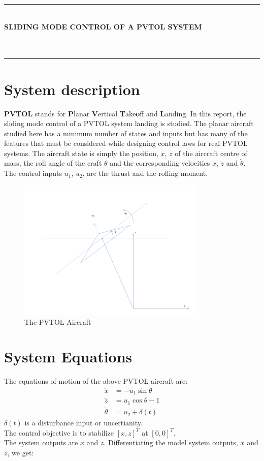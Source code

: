 \documentclass{article}
\newcommand{\hmwkTitle}{}
\newcommand{\hmwkDueDate}{}
\newcommand{\hmwkClass}{Sliding Mode Control of a PVTOL system}
\begin{document}
\clearpage
\thispagestyle{empty}
\clearpage
\noindent\rule{\textwidth}{0.4pt} \\
\textbf{\MakeUppercase{\hmwkClass}} \\
\textbf{\MakeUppercase{\hmwkTitle}} \\
\hmwkDueDate \\

\noindent\rule{\textwidth}{0.4pt}
\section{System description}
\textbf{PVTOL} stands for \textbf{P}lanar \textbf{V}ertical \textbf{T}ake\textbf{o}ff and \textbf{L}anding. In this report, the sliding mode control of a PVTOL system landing is studied. The planar aircraft studied here has a minimum number of states and inputs but has many of the features that must be considered while designing control laws for real PVTOL systems. The  aircraft state is simply the position, $x$, $z$ of the aircraft centre of mass, the roll angle of the craft $\theta$ and the corresponding velocities $\dot{x}$, $\dot{z}$ and $\dot{\theta}$. The control inputs $u_1$, $u_2$, are the thrust and the rolling moment. \\
\begin{figure}[H]
\centering
\includegraphics[width = 0.8\textwidth]{Figures/figure1.png}
\caption{The PVTOL Aircraft}
\label{fig:figure1}
\end{figure}
\section{System Equations}
The equations of motion of the above PVTOL aircraft are:
\begin{equation}\label{set 1.1}
  \begin{split}
\ddot{x}&=-u_1 \sin \theta \\
\ddot{z}&=u_1 \cos \theta -1\\
\ddot{\theta}&=u_2 + \delta(t)
  \end{split}
\end{equation}
$\delta(t)$ is a disturbance input or uncertianity.\\
The control objective is to stabilize $[x,z]^T$ at $[0,0]^T$.\\
The system outputs are $x$ and $z$. Differentiating the model system outputs, $x$ and $z$, we get:
\end{document}

